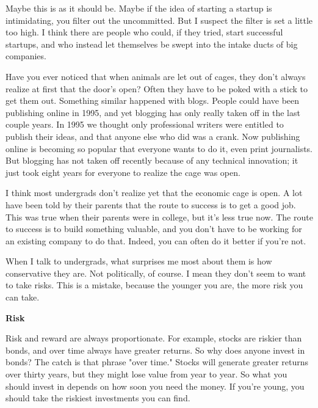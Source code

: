 Maybe
                    this is as it should be. Maybe if the idea of starting a
                    startup is intimidating, you filter out the uncommitted. But
                    I suspect the filter is set a little too high. I think there
                    are people who could, if they tried, start successful
                    startups, and who instead let themselves be swept into the
                    intake ducts of big companies.

Have you ever
                    noticed that when animals are let out of cages, they don't
                    always realize at first that the door's open? Often they
                    have to be poked with a stick to get them out. Something
                    similar happened with blogs. People could have been
                    publishing online in 1995, and yet blogging has only really
                    taken off in the last couple years. In 1995 we thought only
                    professional writers were entitled to publish their ideas,
                    and that anyone else who did was a crank. Now publishing
                    online is becoming so popular that everyone wants to do it,
                    even print journalists. But blogging has not taken off
                    recently because of any technical innovation; it just took
                    eight years for everyone to realize the cage was open.

I
                    think most undergrads don't realize yet that the economic
                    cage is open. A lot have been told by their parents that the
                    route to success is to get a good job. This was true when
                    their parents were in college, but it's less true now. The
                    route to success is to build something valuable, and you
                    don't have to be working for an existing company to do that.
                    Indeed, you can often do it better if you're not.

When
                    I talk to undergrads, what surprises me most about them is
                    how conservative they are. Not politically, of course. I
                    mean they don't seem to want to take risks. This is a
                    mistake, because the younger you are, the more risk you can
                    take.

\textbf{Risk}

Risk and reward are
                    always proportionate. For example, stocks are riskier than
                    bonds, and over time always have greater returns. So why
                    does anyone invest in bonds? The catch is that phrase "over
                    time." Stocks will generate greater returns over thirty
                    years, but they might lose value from year to year. So what
                    you should invest in depends on how soon you need the money.
                    If you're young, you should take the riskiest investments
                    you can find.


